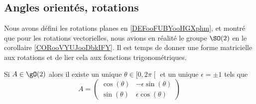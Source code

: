 \subsection{Angles orientés, rotations}

Nous avons défini les rotations planes en \ref{DEFooFUBYooHGXphm}, et montré que pour les rotations vectorielles, nous avions en réalité le groupe \( \SO(2)\) en le corollaire \ref{CORooVYUJooDbkIFY}. Il est temps de donner une forme matricielle aux rotations et de lier cela aux fonctions trigonométriques.

\begin{lemma}       \label{LEMooAJMAooXPSKtS}
    Si \( A\in \gO(2)\) alors il existe un unique \( \theta\in\mathopen[ 0 , 2\pi \mathclose[\) et un unique \( \epsilon=\pm 1\) tels que
    \begin{equation}
        A=\begin{pmatrix}
            \cos(\theta)    &   -\epsilon\sin(\theta)    \\ 
            \sin(\theta)    &   \epsilon\cos(\theta)    
        \end{pmatrix}
    \end{equation}
\end{lemma}


